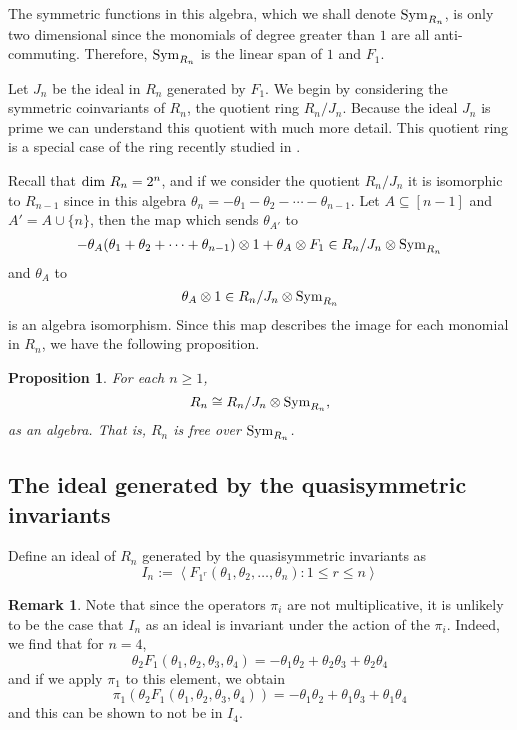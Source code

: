 \documentclass[11pt]{amsart}
\newtheorem{prop}[theorem]{Proposition}
\theoremstyle{definition}
\newtheorem{remark}[theorem]{Remark}
\numberwithin{equation}{section}
\begin{document}
The symmetric functions in this algebra, which we shall denote ${\rm Sym}_{R_n}$,
is only two dimensional since the monomials of degree greater than $1$
are all anti-commuting.  Therefore, ${\rm Sym}_{R_n}$ is the linear span of $1$ and $F_1$.

Let $J_n$ be the ideal in $R_n$ generated by $F_1$.
We begin by considering the symmetric
coinvariants of $R_n$, the quotient ring $R_n/J_n$.
Because the ideal $J_n$ is prime we can
understand this quotient with much more detail.
This quotient ring is a special case of the ring
recently studied in \cite{IRR,KR}.

Recall that ${\rm dim}~R_n = 2^n$,
and if we consider the quotient $R_n/J_n$ it is isomorphic to $R_{n-1}$ since
in this algebra $\theta_n = - \theta_1 -\theta_2 - \cdots - \theta_{n-1}$.
Let $A \subseteq [n-1]$ and $A' = A \cup \{n\}$, then
the map which sends
$\theta_{A'}$ to
$$-\theta_{A}(\theta_1 + \theta_2 + \cdots + \theta_{n-1}) \otimes 1
+ \theta_{A} \otimes F_1 \in R_n/J_n \otimes {\rm Sym}_{R_n}$$
and $\theta_{A}$ to
$$\theta_{A} \otimes 1 \in R_n/J_n \otimes {\rm Sym}_{R_n}$$
is an algebra isomorphism.  Since this map describes the image
for each monomial in $R_n$, we have the following proposition.

\begin{prop}
For each $n \geq 1$,
$$R_n \cong R_n/J_n \otimes {\rm Sym}_{R_n},$$
as an algebra.  That is, $R_n$ is free over ${\rm Sym}_{R_n}$.
\end{prop}

\subsection{The ideal generated by the quasisymmetric invariants}

Define an ideal of $R_n$ generated by the quasisymmetric invariants as
\[
I_n := \left< F_{1^r}(\theta_1, \theta_2, \ldots, \theta_n) : 1 \leq r \leq n \right>
\]

\begin{remark}
Note that since the operators $\pi_i$ are not multiplicative, it
is unlikely to be the case that $I_n$ as an ideal is invariant
under the action of the $\pi_i$.  Indeed, we find that for $n=4$,
\[
\theta_2 F_{1}(\theta_1, \theta_2, \theta_3, \theta_4) =
-\theta_1 \theta_2 + \theta_2 \theta_3 + \theta_2 \theta_4
\]
and if we apply $\pi_1$ to this element, we obtain
\[
\pi_1(\theta_2 F_{1}(\theta_1, \theta_2, \theta_3, \theta_4)) =
-\theta_1 \theta_2 + \theta_1 \theta_3 + \theta_1 \theta_4
\]
and this can be shown to not be in $I_4$.
\end{remark}
\end{document}
